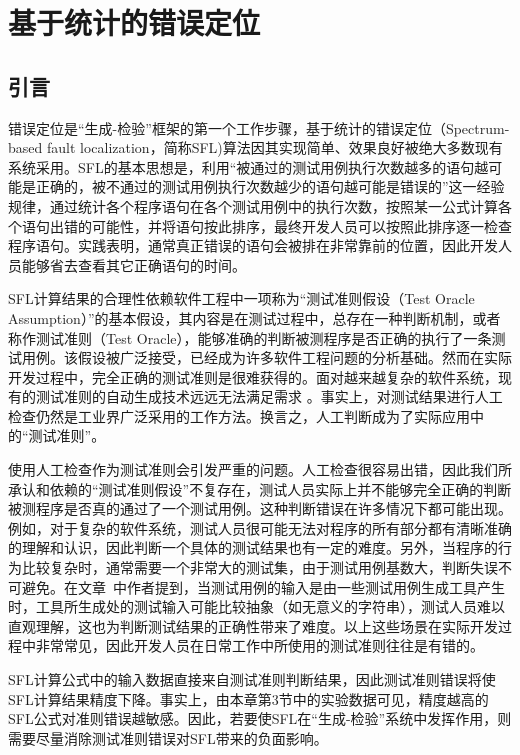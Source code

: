 \chapter{基于统计的错误定位}
\label{cha:fl}

\section{引言}
\label{sec: introduction}
错误定位是“生成-检验”框架的第一个工作步骤，基于统计的错误定位（Spectrum-based fault localization，简称SFL)算法因其实现简单、效果良好被绝大多数现有系统采用。SFL的基本思想是，利用“被通过的测试用例执行次数越多的语句越可能是正确的，被不通过的测试用例执行次数越少的语句越可能是错误的”这一经验规律，通过统计各个程序语句在各个测试用例中的执行次数，按照某一公式计算各个语句出错的可能性，并将语句按此排序，最终开发人员可以按照此排序逐一检查程序语句。实践表明，通常真正错误的语句会被排在非常靠前的位置，因此开发人员能够省去查看其它正确语句的时间。

SFL计算结果的合理性依赖软件工程中一项称为“测试准则假设（Test Oracle Assumption）”的基本假设，其内容是在测试过程中，总存在一种判断机制，或者称作测试准则（Test Oracle），能够准确的判断被测程序是否正确的执行了一条测试用例\cite{Peters:1994:GTO:186258.186508}。该假设被广泛接受，已经成为许多软件工程问题的分析基础。然而在实际开发过程中，完全正确的测试准则是很难获得的。面对越来越复杂的软件系统，现有的测试准则的自动生成技术远远无法满足需求 \cite{harman2013comprehensive}。事实上，对测试结果进行人工检查仍然是工业界广泛采用的工作方法\cite{manolache2001software}。换言之，人工判断成为了实际应用中的“测试准则”。

使用人工检查作为测试准则会引发严重的问题。人工检查很容易出错\cite{manolache2001software}，因此我们所承认和依赖的“测试准则假设”不复存在，测试人员实际上并不能够完全正确的判断被测程序是否真的通过了一个测试用例。这种判断错误在许多情况下都可能出现。例如，对于复杂的软件系统，测试人员很可能无法对程序的所有部分都有清晰准确的理解和认识，因此判断一个具体的测试结果也有一定的难度。另外，当程序的行为比较复杂时，通常需要一个非常大的测试集，由于测试用例基数大，判断失误不可避免。在文章~\cite{mcminn2010reducing}中作者提到，当测试用例的输入是由一些测试用例生成工具产生时，工具所生成处的测试输入可能比较抽象（如无意义的字符串），测试人员难以直观理解，这也为判断测试结果的正确性带来了难度。以上这些场景在实际开发过程中非常常见，因此开发人员在日常工作中所使用的测试准则往往是有错的。

SFL计算公式中的输入数据直接来自测试准则判断结果，因此测试准则错误将使SFL计算结果精度下降。事实上，由本章第3节中的实验数据可见，精度越高的SFL公式对准则错误越敏感。因此，若要使SFL在“生成-检验”系统中发挥作用，则需要尽量消除测试准则错误对SFL带来的负面影响。

